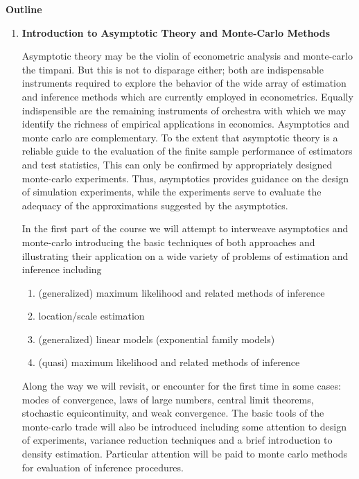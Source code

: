\vspace{10mm}
\begin{center}
{\bf Outline}
\end{center}

\begin{enumerate}
\item {\bf Introduction to Asymptotic Theory and Monte-Carlo Methods}

Asymptotic theory may be  the violin of econometric analysis and 
monte-carlo  the timpani. But this is not  to disparage either;  both are 
indispensable instruments required to explore the behavior of the 
wide array of estimation and inference methods which are currently 
employed in econometrics.  
Equally indispensible are the remaining instruments of orchestra with
which we may identify the richness of empirical applications in economics.
Asymptotics and monte carlo are complementary.  To the 
extent that asymptotic theory is a reliable guide to the evaluation of the 
finite sample performance of estimators and test statistics,  This can 
only be confirmed by appropriately designed monte-carlo experiments.  Thus,
asymptotics provides guidance on the design of simulation experiments, 
while the experiments serve to evaluate the adequacy of the approximations 
suggested by the asymptotics.

In the first part of the course we will attempt to interweave 
asymptotics and monte-carlo introducing the basic techniques of both 
approaches and illustrating their application on a wide variety of problems
of estimation and inference including

\begin{enumerate}
\item (generalized) maximum likelihood and related methods of inference 
 \item location/scale estimation 
 \item (generalized) linear models (exponential family models) 
 \item (quasi) maximum likelihood and related methods of inference
\end{enumerate}

\noindent
Along the way we will revisit, or encounter for the first time in some 
cases:  modes of convergence, laws of large numbers, central 
limit theorems, stochastic equicontinuity, and weak convergence.  The basic
tools of the monte-carlo trade will also be introduced including some attention
to design of experiments, variance reduction techniques and a brief
introduction to density estimation.  Particular attention will be paid to
monte carlo methods for evaluation of inference procedures.  


\end{enumerate}
